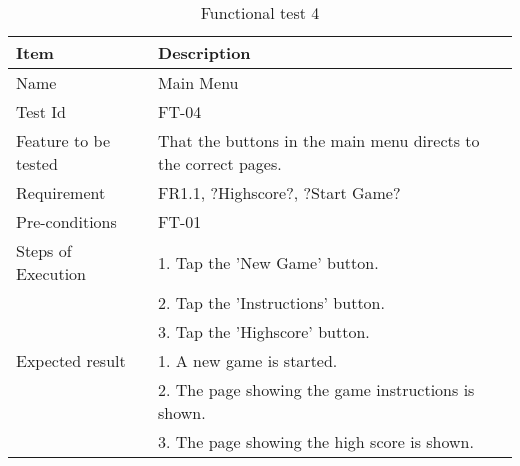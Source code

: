 \begin{table}[H]
\centering
	\begin{tabular}{ l | p{8cm} }
		\hline
		{\bf Item} & {\bf Description} \\ \hline
		Name & Main Menu \\ 
		Test Id & FT-04 \\ 
		Feature to be tested & That the buttons in the main menu directs to the correct pages. \\ 
		Requirement & FR1.1, ?Highscore?, ?Start Game? \\ 
		Pre-conditions & FT-01 \\ 
		Steps of Execution & 1. Tap the 'New Game' button. \\
		& 2. Tap the 'Instructions' button. \\
		& 3. Tap the 'Highscore' button. \\
		Expected result & 1. A new game is started. \\
		& 2. The page showing the game instructions is shown. \\
		& 3. The page showing the high score is shown. \\
	\end{tabular}
	\caption{Functional test 4}
\end{table}

